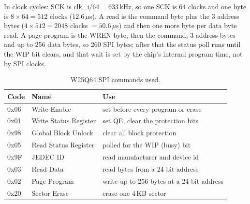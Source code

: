 \documentclass[a4paper,10pt]{article}
\begin{document}
In clock cycles: SCK is clk\_i$/64 = 633$\,kHz, so one SCK is 64 clocks and one
byte is $8\times64 = 512$ clocks ($12.6\,\mu$s). A read is the command byte plus the 3
address bytes ($4\times512 = 2048$ clocks $= 50.6\,\mu$s) and then one more byte per data
byte read. A page program is the WREN byte, then the command, 3 address bytes and up to
256 data bytes, so 260 SPI bytes; after that the status poll runs until the WIP bit
clears, and that wait is set by the chip's internal program time, not by SPI clocks.

\begin{table}[H]
\centering
\caption{W25Q64 SPI commands used.}
\label{tab:nor-cmd}
\begin{tabular}{lll}
\hline
Code & Name & Use \\
\hline
0x06 & Write Enable & set before every program or erase \\
0x01 & Write Status Register & set QE, clear the protection bits \\
0x98 & Global Block Unlock & clear all block protection \\
0x05 & Read Status Register & polled for the WIP (busy) bit \\
0x9F & JEDEC ID & read manufacturer and device id \\
0x03 & Read Data & read bytes from a 24 bit address \\
0x02 & Page Program & write up to 256 bytes at a 24 bit address \\
0x20 & Sector Erase & erase one 4\,KB sector \\
\hline
\end{tabular}
\end{table}
\end{document}
